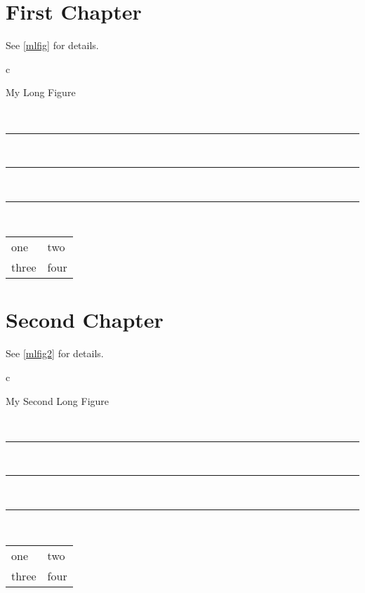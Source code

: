 \documentclass{book}
\begin{document}
\listofdisplay
\chapter{First Chapter}

See \ref{mlfig} for details.

\begin{longfigure}{c}
\caption{My Long Figure}\label{mlfig}\\
\rule{3in}{1in}\\
\rule{3in}{1in}\\
\pagebreak
\rule{3in}{1in}\\

\begin{tabular}{ll}
one & two \\
three & four\\
\end{tabular}
\end{longfigure}

\chapter{Second Chapter}

See \ref{mlfig2} for details.
\begin{longfigure}{c}
\caption{My Second Long Figure}\label{mlfig2}\\
\rule{3in}{1in}\\
\rule{3in}{1in}\\
\rule{3in}{1in}\\
\begin{tabular}{ll}
one & two \\
three & four\\
\end{tabular}
\end{longfigure}
\end{document}
